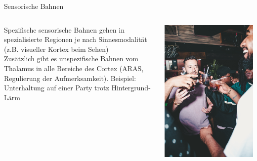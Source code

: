 \documentclass{beamer}
\begin{document}
\begin{frame}{Sensorische Bahnen}


\begin{columns}[c]

\begin{column}{5cm} 
Spezifische sensorische Bahnen gehen in spezialisierte Regionen je nach Sinnesmodalität (z.B. visueller Kortex beim Sehen)  \\[0.2 cm]

Zusätzlich gibt es unspezifische Bahnen vom Thalamus in alle Bereiche des Cortex (ARAS, Regulierung der Aufmerksamkeit). Beispiel: Unterhaltung auf einer Party trotz Hintergrund-Lärm

\end{column}

\begin{column}{5cm}
\begin{center}
    \includegraphics[width=\textwidth]{party.jpg}
\end{center}

\end{column}


\end{columns}







\end{frame}
\end{document}
